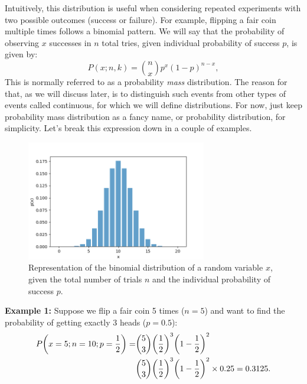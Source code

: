 \documentclass{book}
\begin{document}
Intuitively, this distribution is useful when considering repeated experiments with two possible outcomes (success or failure). For example, flipping a fair coin multiple times follows a binomial pattern. We will say that the probability of observing $x$ successes in $n$ total tries, given individual probability of success $p$, is given by:
\begin{equation}
    P(x; n, k) = \binom{n}{x} p^x (1-p)^{n-x},
\end{equation}
This is normally referred to as a probability \textit{mass} distribution. The reason for that, as we will discuss later, is to distinguish such events from other types of events called continuous, for which we will define  distributions. For now, just keep probability mass distribution as a fancy name, or probability distribution, for simplicity. Let's break this expression down in a couple of examples.

\begin{figure}[ht]
    \centering
    \includegraphics[width=0.7\textwidth]{figures/chapter2/binomial.png}
    \caption{Representation of the binomial distribution of a random variable $x$, given the total number of trials $n$ and the individual probability of success $p$.}
    \label{fig:random}
\end{figure}

\textbf{Example 1:} Suppose we flip a fair coin 5 times ($n=5$) and want to find the probability of getting exactly 3 heads ($p=0.5$):
\begin{align}
    P\bigg(x=5; n = 10; p = \frac{1}{2}\bigg) = &\binom{5}{3} \bigg(\frac{1}{2}\bigg)^3 \bigg(1 - \frac{1}{2}\bigg)^2  \notag \\
    &\binom{5}{3} \bigg(\frac{1}{2}\bigg)^3 \bigg(1 - \frac{1}{2}\bigg)^2  \notag \times 0.25 = 0.3125.
\end{align}\\
\end{document}

